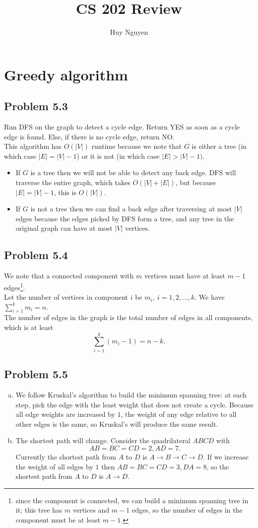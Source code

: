 \documentclass[12pt]{report}
\title{CS 202 Review}
\author{Huy Nguyen}
\begin{document}
\tableofcontents

\chapter[Chapter 5 Solution]{Greedy algorithm}

\section{Problem 5.3}
Run DFS on the graph to detect a cycle edge. Return YES as soon as a cycle edge is found. Else, if there is no cycle edge, return NO.\\
This algorithm has $O(|V|)$ runtime because we note that $G$ is either a tree (in which case $|E| = |V| - 1$) or it is not (in which case $|E| > |V| - 1)$.
\begin{itemize}
  \item If $G$ is a tree then we will not be able to detect any back edge. DFS will traverse the entire graph, which takes $O(|V| + |E|)$, but because $|E| = |V| - 1$, this is $O(|V|)$.
  \item If $G$ is not a tree then we can find a back edge after traversing at most $|V|$ edges because the edges picked by DFS form a tree, and any tree in the original graph can have at most $|V|$ vertices.
\end{itemize}

\section{Problem 5.4}
We note that a connected component with $m$ vertices must have at least $m - 1$ edges\footnote{since the component is connected, we can build a minimum spanning tree in it; this tree has $m$ vertices and $m-1$ edges, so the number of edges in the component must be at least $m-1$.}. \\
Let the number of vertices in component $i$ be $m_i, \ i = 1,2,\ldots,k$. We have $\displaystyle \sum_{i=1}^k m_i = n$.\\
The number of edges in the graph is the total number of edges in all components, which is at least $$\sum_{i=1}^k (m_i - 1) = n - k.$$


\section{Problem 5.5}
\begin{enumerate}[(a)]
  \item We follow Kruskal's algorithm to build the minimum spanning tree: at each step, pick the edge with the least weight that does not create a cycle. Because all edge weights are increased by $1$, the weight of any edge relative to all other edges is the same, so Kruskal's will produce the same result.
  \item The shortest path will change. Consider the quadrilateral $ABCD$ with $$AB = BC = CD = 2, AD = 7.$$ Currently the shortest path from $A$ to $D$ is $A \to B \to C \to D$. If we increase the weight of all edges by $1$ then $AB = BC = CD = 3, DA = 8$, so the shortest path from $A$ to $D$ is $A \to D$.
\end{enumerate}
\end{document}
